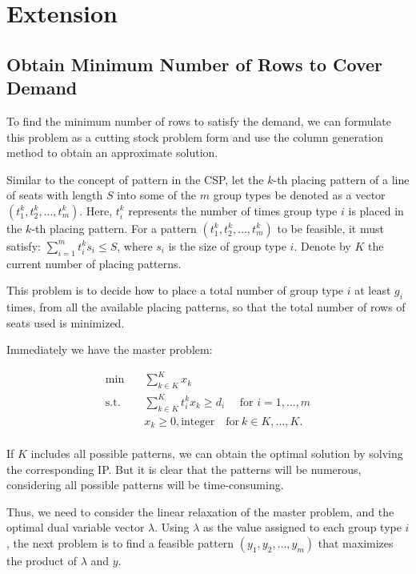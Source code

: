 
\section{Extension}

\subsection{Obtain Minimum Number of Rows to Cover Demand}

To find the minimum number of rows to satisfy the demand, we can formulate this problem as a cutting stock problem form and use the column generation method to obtain an approximate solution.

Similar to the concept of pattern in the CSP, let the $k$-th placing pattern of a line of seats with length $S$ into some of the $m$ group types be denoted as a vector $(t^k_1,t^k_2,\ldots,t^k_m)$. Here, $t^k_i$ represents the number of times group type $i$ is placed in the $k$-th placing pattern. For a pattern $(t^k_1,t^k_2,\ldots,t^k_m)$ to be feasible, it must satisfy: $\sum_{i=1}^m t^k_i s_i \leq S$, where $s_i$ is the size of group type $i$. Denote by $K$ the current number of placing patterns.


This problem is to decide how to place a total number of group type $i$ at least $g_i$ times, from all the available placing patterns, so that the total number of rows of seats used is minimized.

Immediately we have the master problem:

\[\begin{split}\mbox{min}\quad & \sum_{k \in K}^K x_{k}\\
 \mbox{s.t.} \quad & \sum_{k \in K}^K t_i^k x_k \geq d_i  \quad  \mbox{ for } i=1,\ldots,m \\
  & x_k \geq 0, \mbox{integer}\quad \mbox{for}~ k \in K,\ldots,K.\\
\end{split}\]

If $K$ includes all possible patterns, we can obtain the optimal solution by solving the corresponding IP. But it is clear that the patterns will be numerous, considering all possible patterns will be time-consuming.

Thus, we need to consider the linear relaxation of the master problem, and the optimal dual variable vector $\lambda$. Using $\lambda$ as the value assigned to each group type $i$, the next problem is to find a feasible pattern $(y_1,y_2,\ldots,y_m)$ that maximizes the product of $\lambda$ and $y$.


